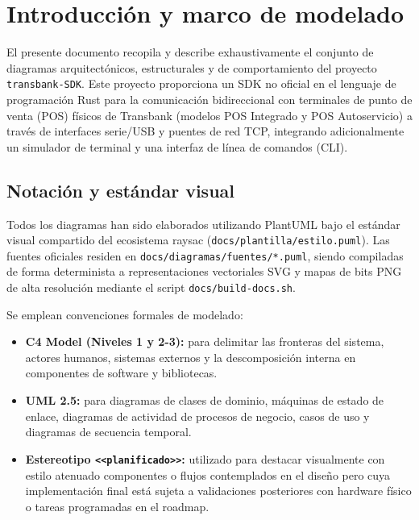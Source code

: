 \documentclass{../../plantilla/raysac-informe}
\begin{document}
\portada

\begin{controlversiones}
\end{controlversiones}

\avisolegalestandar

\clearpage
\preliminares

\section{Introducción y marco de modelado}

El presente documento recopila y describe exhaustivamente el conjunto de diagramas arquitectónicos,
estructurales y de comportamiento del proyecto \texttt{transbank-SDK}. Este proyecto proporciona un
SDK no oficial en el lenguaje de programación Rust para la comunicación bidireccional con terminales
de punto de venta (POS) físicos de Transbank (modelos POS Integrado y POS Autoservicio) a través de
interfaces serie/USB y puentes de red TCP, integrando adicionalmente un simulador de terminal y una
interfaz de línea de comandos (CLI).

\subsection{Notación y estándar visual}

Todos los diagramas han sido elaborados utilizando PlantUML bajo el estándar visual compartido del
ecosistema raysac (\texttt{docs/plantilla/estilo.puml}). Las fuentes oficiales residen en
\texttt{docs/diagramas/fuentes/*.puml}, siendo compiladas de forma determinista a representaciones
vectoriales SVG y mapas de bits PNG de alta resolución mediante el script \texttt{docs/build-docs.sh}.

Se emplean convenciones formales de modelado:
\begin{itemize}
  \item \textbf{C4 Model (Niveles 1 y 2-3):} para delimitar las fronteras del sistema, actores humanos,
    sistemas externos y la descomposición interna en componentes de software y bibliotecas.
  \item \textbf{UML 2.5:} para diagramas de clases de dominio, máquinas de estado de enlace, diagramas
    de actividad de procesos de negocio, casos de uso y diagramas de secuencia temporal.
  \item \textbf{Estereotipo \texttt{<<planificado>>}:} utilizado para destacar visualmente con estilo
    atenuado componentes o flujos contemplados en el diseño pero cuya implementación final está sujeta
    a validaciones posteriores con hardware físico o tareas programadas en el roadmap.
\end{itemize}
\end{document}
